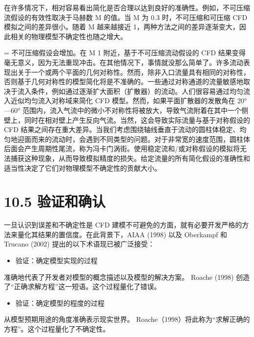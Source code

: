 \documentclass[11pt,a4paper,openany,fontset=none]{ctexbook}
\begin{document}
在许多情况下，相对容易看出简化是否合理以达到良好的准确性。例如，不可压缩流假设的有效性取决于马赫数 M 的值。当 M 为 0.3 时，不可压缩和可压缩 CFD 模拟之间的差异很小。随着 M 越来越接近 1，两种方法之间的差异逐渐变大，因此相关的物理模型不确定性也随之增大。

= 不可压缩假设会增加。在 M 1 附近，基于不可压缩流动假设的 CFD 结果变得毫无意义，因为无法重现冲击。在其他情况下，事情就没那么简单了。许多流动表现出关于一个或两个平面的几何对称性。然而，除非入口流量具有相同的对称性，否则基于几何对称性的模型简化将是不准确的。一些通过对称通道的流量敏感地取决于流入条件，例如通过逐渐扩大面积（扩散器）的流动。人们很容易通过均匀流入近似均匀流入对称域来简化 CFD 模型。然而，如果平面扩散器的发散角在 20°—60° 范围内，流入气流中的微小不对称性将被放大，导致气流附着在其中一个侧壁上，同时在相对壁上产生反向气流。当然，这会导致实际流量与基于对称假设的 CFD 结果之间存在重大差异。当我们考虑围绕轴线垂直于流动的圆柱体稳定、均匀地迎面而来的流动时，会遇到不同类型的问题。对于非常宽的速度范围，圆柱体后面会产生周期性尾流，称为冯卡门涡街。使用稳定流和/或对称假设的模拟将无法捕获这种现象，从而导致模拟精度的损失。给定流量的所有简化假设的准确性和适当性决定了它们对物理模型不确定性的贡献大小。

\section*{10.5 验证和确认}

一旦认识到误差和不确定性是 CFD 建模不可避免的方面，就有必要开发严格的方法来量化其结果的置信度。在此背景下，AIAA (1998) 以及 Oberkampf 和 Trucano (2002) 提出的以下术语现已被广泛接受：

\begin{itemize}

\item 验证：确定模型实现的过程

\end{itemize}

准确地代表了开发者对模型的概念描述以及模型的解决方案。 Roache (1998) 创造了“正确求解方程”这一短语。这个过程量化了错误。

\begin{itemize}

\item 验证：确定模型的程度的过程

\end{itemize}

从模型预期用途的角度准确表示现实世界。 Roache（1998）将此称为“求解正确的方程”。这个过程量化了不确定性。
\end{document}
